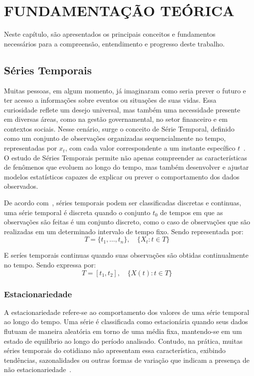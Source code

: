 \chapter{FUNDAMENTAÇÃO TEÓRICA}
Neste capítulo, são apresentados os principais conceitos e fundamentos necessários para a compreensão, 
entendimento e progresso deste trabalho.


\section{Séries Temporais}
    Muitas pessoas, em algum momento, já imaginaram como seria prever o futuro e ter acesso a informações sobre eventos 
    ou situações de suas vidas. Essa curiosidade reflete um desejo universal, mas também uma necessidade presente em 
    diversas áreas, como na gestão governamental, no setor financeiro e em contextos sociais. Nesse cenário, surge o 
    conceito de Série Temporal, definido como um conjunto de observações organizadas sequencialmente no tempo, 
    representadas por \( x_t \), com cada valor correspondente a um instante específico \(t\)~\cite{box2015}. O estudo de 
    Séries Temporais permite não apenas compreender as características de fenômenos que evoluem ao longo do tempo, mas 
    também desenvolver e ajustar modelos estatísticos capazes de explicar ou prever o comportamento dos dados 
    observados.
    
    De acordo com~\cite{brockwell2002}, séries temporais podem ser classificadas 
    discretas e continuas, uma série temporal é discreta quando o conjunto \( t_0 \) de tempos em que as observações 
    são feitas é um conjunto discreto, como o caso de observações que são realizadas em um determinado intervalo de 
    tempo fixo. Sendo representada por:
    \begin{equation}
        T = \{t_1, \dots, t_n\}, \quad \{X_t : t \in T\}
    \end{equation}
    
    
    E seríes temporais continuas quando suas observações são obtidas continualmente 
    no tempo. Sendo expressa por: 
    \begin{equation}
        T = [t_1, t_2], \quad \{X(t) : t \in T\}
    \end{equation}
        
    \subsection{Estacionariedade}
        A estacionariedade refere-se ao comportamento dos valores de uma série temporal ao longo do tempo. Uma série é 
        classificada como estacionária quando seus dados flutuam de maneira aleatória em torno de uma média fixa, mantendo-se em 
        um estado de equilíbrio ao longo do período analisado. Contudo, na prática, muitas séries temporais do cotidiano não 
        apresentam essa característica, exibindo tendências, sazonalidades ou outras formas de variação que indicam a presença de 
        não estacionariedade~\cite{morettin2018}.

